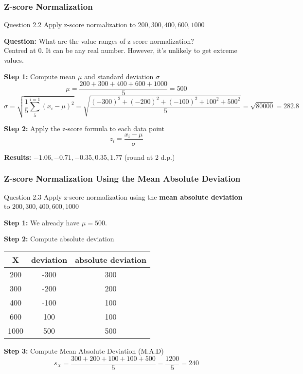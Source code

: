 \documentclass[aspectratio=169, 10pt]{beamer}
\begin{document}

\begin{frame}[t]
    \frametitle{Z-score Normalization}
    \small

    \begin{block}{Question 2.2}
        Apply z-score normalization to $200, 300, 400, 600, 1000$
    \end{block}

    \textbf{Question:} What are the value ranges of z-score normalization?\\
    Centred at 0. It can be any real number. However, it's unlikely to get extreme values.\\

    \vspace{1em}

    \textbf{Step 1:} Compute mean $\mu$ and standard deviation $\sigma$
    \[\mu = \frac{200+300+400+600+1000}{5}=500\]
    \[\sigma = \sqrt{\frac{1}{5}\sum_{5}^{i=1}(x_i-\mu)^2} = \sqrt{\frac{(-300)^2 + (-200)^2 + (-100)^2 + 100^2 + 500^2}{5}}= \sqrt{80000}=282.8\]

    \textbf{Step 2:} Apply the z-score formula to each data point
    \[z_i = \frac{x_i - \mu}{ \sigma}\]

    \textbf{Results:} $-1.06, -0.71, -0.35, 0.35, 1.77$ (round at 2 d.p.)
    
\end{frame}


\begin{frame}[t]
    \frametitle{Z-score Normalization Using the Mean Absolute Deviation}
    \small

    \begin{block}{Question 2.3}
        Apply z-score normalization using the \textbf{mean absolute deviation} to $200, 300, 400, 600, 1000$
    \end{block}

    \textbf{Step 1:} We already have $\mu=500$.

    \textbf{Step 2:} Compute absolute deviation
    \begin{table}[]
        \begin{tabular}{ccc}
              X & deviation  & absolute deviation \\
              \hline
              200  & -300 & 300\\
              300  & -200 & 200\\
              400  & -100 & 100\\
              600  & 100  & 100\\
              1000 & 500  & 500
        \end{tabular}
    \end{table}
    \textbf{Step 3:} Compute Mean Absolute Deviation (M.A.D)
    \[s_X  = \frac{300+200+100+100+500}{5}=\frac{1200}{5}=240 \]
    
\end{frame}
\end{document}
